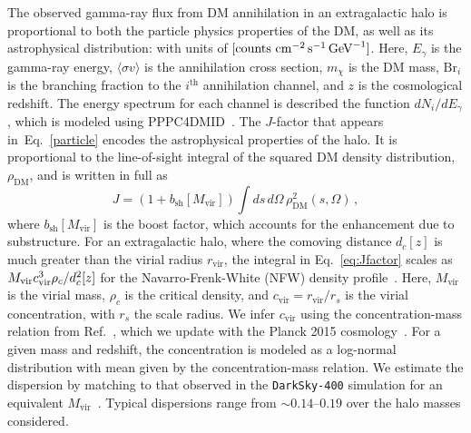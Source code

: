    The observed gamma-ray flux from DM annihilation in an extragalactic halo is proportional to both the particle physics properties of the DM, as well as its astrophysical distribution:
with units of $[{\rm counts} \,\,{\rm cm}^{-2} \, {\rm s}^{-1} \, {\rm GeV}^{-1}]$.  Here, $E_\gamma$ is the gamma-ray energy, $\langle \sigma v \rangle$ is the annihilation cross section, $m_\chi$ is the DM mass, $\text{Br}_{i}$ is the branching fraction to the $i^\text{th}$ annihilation channel, and $z$ is the cosmological redshift.  The energy spectrum for each channel is described the function $dN_{i}/dE_{\gamma}$, which is modeled using PPPC4DMID~\cite{Cirelli:2010xx}.  The $J$-factor that appears in~Eq.~\ref{particle} encodes the astrophysical properties of the halo.  It is proportional to the line-of-sight integral of the squared DM density distribution, $\rho_\text{DM}$, and is written in full as 
\begin{equation}
J = \left(1+b_\text{sh}[M_\text{vir}] \right)  \int ds\,d \Omega \,\rho^{2}_\text{DM}(s,\Omega) \, ,
\label{eq:Jfactor}
\end{equation}
where $b_\text{sh}[M_\text{vir}]$ is the boost factor, which accounts for the enhancement due to substructure.  For an extragalactic halo, where the comoving distance $d_c[z]$ is much greater than the virial radius $r_\text{vir}$, the integral in Eq.~\ref{eq:Jfactor} scales as $M_{\rm vir} c_{\rm vir}^3\rho_c/d_c^2[z]$ for the Navarro-Frenk-White (NFW) density profile~\cite{Navarro:1996gj}.  Here, $M_\text{vir}$ is the virial mass, $\rho_c$ is the critical density, and $c_\text{vir}=r_\text{vir}/r_s$ is the virial concentration, with $r_s$ the scale radius.  We infer $c_\text{vir}$ using the concentration-mass relation from Ref.~\cite{Correa:2015dva}, which we update with the Planck 2015 cosmology~\cite{Ade:2015xua}.  
For a given mass and redshift, the concentration is modeled as a log-normal distribution with mean given by the concentration-mass relation.  We estimate the dispersion by matching to that observed in the \texttt{DarkSky-400} simulation for an equivalent $M_\text{vir}$~\cite{Lehmann:2015ioa}.  Typical dispersions range from $\sim$$0.14$--$0.19$ over the halo masses considered. 

